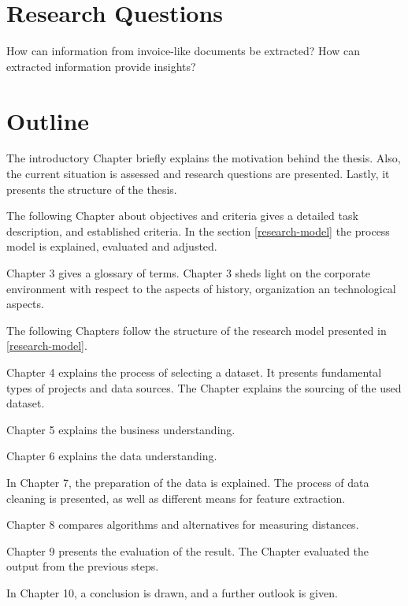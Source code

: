 \section{Research Questions}
\label{section:research-q}
How can information from invoice-like documents be extracted?
How can extracted information provide insights?

\section{Outline}
The introductory Chapter briefly explains the motivation behind the thesis. Also, the current situation is assessed and research questions are presented. Lastly, it presents the structure of the thesis.

The following Chapter about objectives and criteria gives a detailed task description, and established criteria. In the section \ref{research-model} the process model is explained, evaluated and adjusted.

Chapter 3 gives a glossary of terms. Chapter 3 sheds light on the corporate environment with respect to the aspects of history, organization an technological aspects. 

The following Chapters follow the structure of the research model presented in \ref{research-model}.

Chapter 4 explains the process of selecting a dataset. It presents fundamental types of projects and data sources. The Chapter explains the sourcing of the used dataset.

Chapter 5 explains the business understanding.

Chapter 6 explains the data understanding.

In Chapter 7, the preparation of the data is explained. The process of data cleaning is presented, as well as different means for feature extraction.

Chapter 8 compares algorithms and alternatives for measuring distances.

Chapter 9 presents the evaluation of the result. The Chapter evaluated the output from the previous steps.

In Chapter 10, a conclusion is drawn, and a further outlook is given.